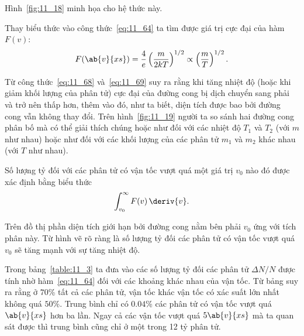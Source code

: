 \noindent
Hình~\ref{fig:11_18} minh họa cho hệ thức này.

Thay biểu thức  vào công thức~\eqref{eq:11_64} ta tìm được giá trị cực đại của hàm $F(v)$:
\vspace{-12pt} \\
\begin{equation}\label{eq:11_69}
	F(\ab{v}{xs}) = \frac{4}{e}\left(\frac{m}{2kT}\right)^{1/2} \propto \left(\frac{m}{T}\right)^{1/2}.
\end{equation}

\noindent
Từ công thức~\eqref{eq:11_68} và~\eqref{eq:11_69} suy ra rằng khi tăng nhiệt độ (hoặc khi giảm khối lượng của phân tử) cực đại của đường cong bị dịch chuyển sang phải và trở nên thấp hơn, thêm vào đó, như ta biết, diện tích được bao bởi đường cong vẫn không thay đổi. Trên hình~\ref{fig:11_19} người ta so sánh hai đường cong phân bố mà có thể giải thích chúng hoặc như đối với các nhiệt độ $T_1$ và $T_2$ (với $m$ như nhau) hoặc như đối với các khối lượng của các phân tử $m_1$ và $m_2$ khác nhau (với $T$ như nhau).

Số lượng tỷ đối với các phân tử có vận tốc vượt quá một giá trị $v_0$ nào đó được xác định bằng biểu thức 
\begin{equation*}
	\int_{v_0}^{\infty} F(v)\,\deriv{v}.
\end{equation*}

\noindent
Trên đồ thị phần diện tích giới hạn bởi đường cong nằm bên phải $v_0$ ứng với tích phân này. Từ hình vẽ  rõ ràng là số lượng tỷ đối các phân tử có vận tốc vượt quá $v_0$ sẽ tăng mạnh với sự tăng nhiệt độ.

Trong bảng~\ref{table:11_3} ta đưa vào các số lượng tỷ đối các phân tử $\Delta N/N$ được tính nhờ hàm~\eqref{eq:11_64} đối với các khoảng khác nhau của vận tốc. Từ bảng suy ra rằng ở $70$\% tất cả các phân tử, vận tốc khác vận tốc có xác suất lớn nhất không quá $50$\%. Trung bình chỉ có $0.04$\% các phân tử có vận tốc vượt quá $\ab{v}{xs}$ hơn ba lần. Ngay cả các vận tốc vượt quá $5\ab{v}{xs}$ mà ta quan sát được thì trung bình cũng chỉ ở một trong 12 tỷ phân tử.

\begin{table}[!b]
	\renewcommand{\arraystretch}{1.2}
	\caption{ }
	\vspace{-0.6cm}
	\label{table:11_3}
	\begin{center}\end{center}
\end{table}

